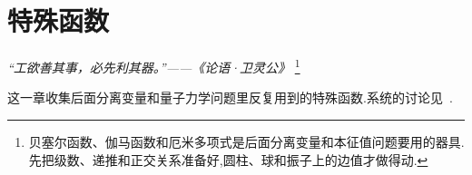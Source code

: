 \chapter{特殊函数}

\begin{flushright}
\textit{“工欲善其事，必先利其器。”——《论语·卫灵公》}
\footnote{贝塞尔函数、伽马函数和厄米多项式是后面分离变量和本征值问题要用的器具.先把级数、递推和正交关系准备好,圆柱、球和振子上的边值才做得动.}
\end{flushright}

这一章收集后面分离变量和量子力学问题里反复用到的特殊函数.系统的讨论见~\cite{wangzhuxi,kreyszig}.

% 







